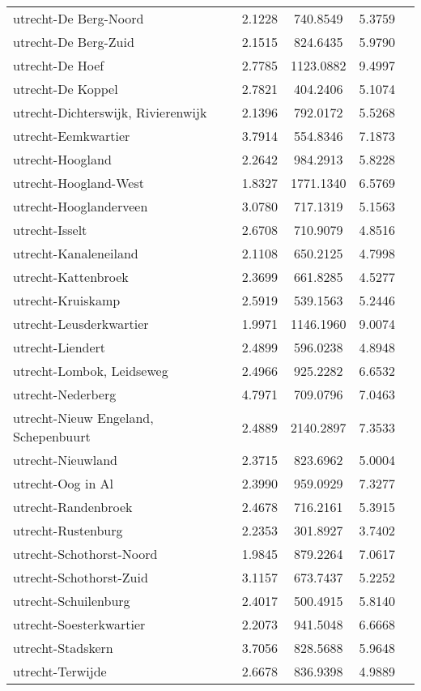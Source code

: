 \begin{longtable}{llccc}
utrecht-De Berg-Noord & 2.1228 & 740.8549 & 5.3759 \\
utrecht-De Berg-Zuid & 2.1515 & 824.6435 & 5.9790 \\
utrecht-De Hoef & 2.7785 & 1123.0882 & 9.4997 \\
utrecht-De Koppel & 2.7821 & 404.2406 & 5.1074 \\
utrecht-Dichterswijk, Rivierenwijk & 2.1396 & 792.0172 & 5.5268 \\
utrecht-Eemkwartier & 3.7914 & 554.8346 & 7.1873 \\
utrecht-Hoogland & 2.2642 & 984.2913 & 5.8228 \\
utrecht-Hoogland-West & 1.8327 & 1771.1340 & 6.5769 \\
utrecht-Hooglanderveen & 3.0780 & 717.1319 & 5.1563 \\
utrecht-Isselt & 2.6708 & 710.9079 & 4.8516 \\
utrecht-Kanaleneiland & 2.1108 & 650.2125 & 4.7998 \\
utrecht-Kattenbroek & 2.3699 & 661.8285 & 4.5277 \\
utrecht-Kruiskamp & 2.5919 & 539.1563 & 5.2446 \\
utrecht-Leusderkwartier & 1.9971 & 1146.1960 & 9.0074 \\
utrecht-Liendert & 2.4899 & 596.0238 & 4.8948 \\
utrecht-Lombok, Leidseweg & 2.4966 & 925.2282 & 6.6532 \\
utrecht-Nederberg & 4.7971 & 709.0796 & 7.0463 \\
utrecht-Nieuw Engeland, Schepenbuurt & 2.4889 & 2140.2897 & 7.3533 \\
utrecht-Nieuwland & 2.3715 & 823.6962 & 5.0004 \\
utrecht-Oog in Al & 2.3990 & 959.0929 & 7.3277 \\
utrecht-Randenbroek & 2.4678 & 716.2161 & 5.3915 \\
utrecht-Rustenburg & 2.2353 & 301.8927 & 3.7402 \\
utrecht-Schothorst-Noord & 1.9845 & 879.2264 & 7.0617 \\
utrecht-Schothorst-Zuid & 3.1157 & 673.7437 & 5.2252 \\
utrecht-Schuilenburg & 2.4017 & 500.4915 & 5.8140 \\
utrecht-Soesterkwartier & 2.2073 & 941.5048 & 6.6668 \\
utrecht-Stadskern & 3.7056 & 828.5688 & 5.9648 \\
utrecht-Terwijde & 2.6678 & 836.9398 & 4.9889 \\

\end{longtable}
